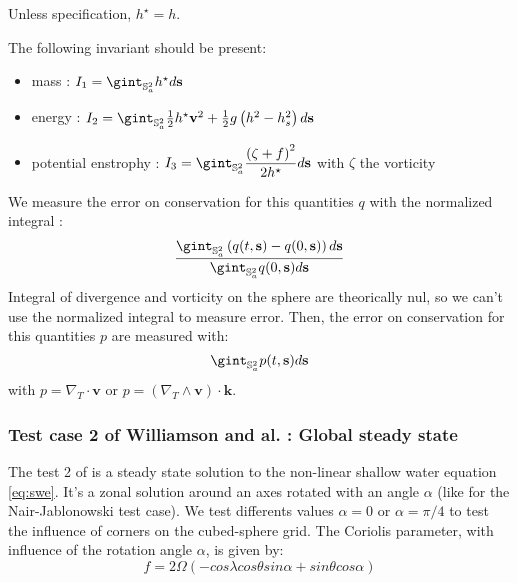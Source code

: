 Unless specification, $h^{\star} = h$.

The following invariant should be present:
\begin{itemize}
\item mass : $I_1=\gint_{\mathbb{S}_a^2} h^{\star}d\mathbf{s}$ \\

\item energy : $I_2 = \gint_{\mathbb{S}_a^2} \frac{1}{2} h^{\star} \mathbf{v}^2 + \frac{1}{2}g \left( h^2 - h_s^2 \right) d\mathbf{s}$ \\

\item potential enstrophy : $I_{3}=\gint_{\mathbb{S}_a^2} \dfrac{\left( \zeta + f \right)^2}{2 h^{\star}} d\mathbf{s}$ with $\zeta$ the vorticity\\
\end{itemize}
We measure the error on conservation for this quantities $q$ with the normalized integral :
\begin{equation}
\dfrac{\gint_{\mathbb{S}_a^2} \left( q(t,\mathbf{s})-q(0,\mathbf{s}) \right) d \mathbf{s}}{\gint_{\mathbb{S}_a^2} q(0,\mathbf{s})d \mathbf{s}}
\end{equation}
Integral of divergence and vorticity on the sphere are theorically nul, so we can't use the normalized integral to measure error. Then, the error on conservation for this quantities $p$ are measured with:
\begin{equation}
\gint_{\mathbb{S}_a^2} p(t,\mathbf{s})d \mathbf{s}
\end{equation}
with $p = \nabla_T \cdot \mathbf{v}$ or $p = \left( \nabla_T \wedge \mathbf{v}  \right) \cdot \mathbf{k}$.

\subsubsection{Test case 2 of Williamson and al. : Global steady state}

The test 2 of \cite{Williamson-Drake-Hack-Jakob-Swarztrauber} is a steady state solution to the non-linear shallow water equation \eqref{eq:swe}. It's a zonal solution around an axes rotated with an angle $\alpha$ (like for the Nair-Jablonowski test case). We test differents values $\alpha = 0$ or $\alpha = \pi/4$ to test the influence of corners on the cubed-sphere grid.
The Coriolis parameter, with influence of the rotation angle $\alpha$, is given by:
\begin{equation}
f=2 \Omega \left( - cos \lambda cos \theta sin \alpha + sin \theta cos \alpha \right)
\end{equation}

